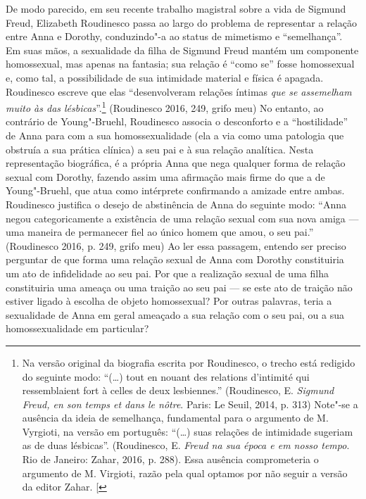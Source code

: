 De modo parecido, em seu recente trabalho magistral sobre a vida de
Sigmund Freud, Elizabeth Roudinesco passa ao largo do problema de
representar a relação entre Anna e Dorothy, conduzindo"-a ao status de
mimetismo e ``semelhança''. Em suas mãos, a sexualidade da filha de
Sigmund Freud mantém um componente homossexual, mas apenas na fantasia;
sua relação é ``como se'' fosse homossexual e, como tal, a possibilidade
de sua intimidade material e física é apagada. Roudinesco escreve que
elas ``desenvolveram relações íntimas \emph{que se assemelham muito às
das lésbicas}''.\footnote{Na versão original da biografia escrita por
  Roudinesco, o trecho está redigido do seguinte modo: ``(\ldots{}) tout
  en nouant des relations d'intimité qui ressemblaient fort à celles de
  deux lesbiennes.'' (Roudinesco, E. \emph{Sigmund Freud, en son temps
  et dans le nôtre}. Paris: Le Seuil, 2014, p. 313) Note"-se a ausência
  da ideia de semelhança, fundamental para o argumento de M. Vyrgioti,
  na versão em português: ``(\ldots{}) suas relações de intimidade
  sugeriam as de duas lésbicas''. (Roudinesco, E. \emph{Freud na sua
  época e em nosso tempo}. Rio de Janeiro: Zahar, 2016, p. 288). Essa
  ausência comprometeria o argumento de M. Virgioti, razão pela qual
  optamos por não seguir a versão da editor Zahar. {[}\versal{N.~T.}{]}}
(Roudinesco 2016, 249, grifo meu) No entanto, ao contrário de
Young"-Bruehl, Roudinesco associa o desconforto e a ``hostilidade'' de Anna
para com a sua homossexualidade (ela a via como uma patologia que
obstruía a sua prática clínica) a seu pai e à sua relação analítica.
Nesta representação biográfica, é a própria Anna que nega qualquer forma
de relação sexual com Dorothy, fazendo assim uma afirmação mais firme do
que a de Young"-Bruehl, que atua como intérprete confirmando a amizade
entre ambas. Roudinesco justifica o desejo de abstinência de Anna do
seguinte modo: ``Anna negou categoricamente a existência de uma relação
sexual com sua nova amiga --- uma maneira de permanecer fiel ao único
homem que amou, o seu pai.'' (Roudinesco 2016, p. 249, grifo meu) Ao ler
essa passagem, entendo ser preciso perguntar de que forma uma relação
sexual de Anna com Dorothy constituiria um ato de infidelidade ao seu
pai. Por que a realização sexual de uma filha constituiria uma ameaça ou
uma traição ao seu pai --- se este ato de traição não estiver ligado à
escolha de objeto homossexual? Por outras palavras, teria a sexualidade
de Anna em geral ameaçado a sua relação com o seu pai, ou a sua
homossexualidade em particular?

